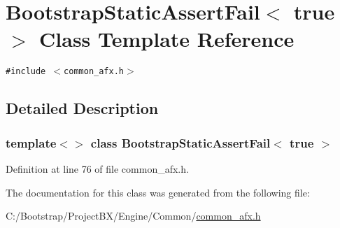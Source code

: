 \hypertarget{class_bootstrap_static_assert_fail_3_01true_01_4}{
\section{BootstrapStaticAssertFail$<$ true $>$ Class Template Reference}
\label{class_bootstrap_static_assert_fail_3_01true_01_4}
}
{\tt \#include $<$common\_\-afx.h$>$}



\subsection{Detailed Description}
\subsubsection*{template$<$$>$ class BootstrapStaticAssertFail$<$ true $>$}



Definition at line 76 of file common\_\-afx.h.

The documentation for this class was generated from the following file:\begin{CompactItemize}
\item 
C:/Bootstrap/ProjectBX/Engine/Common/\hyperlink{common__afx_8h}{common\_\-afx.h}\end{CompactItemize}
